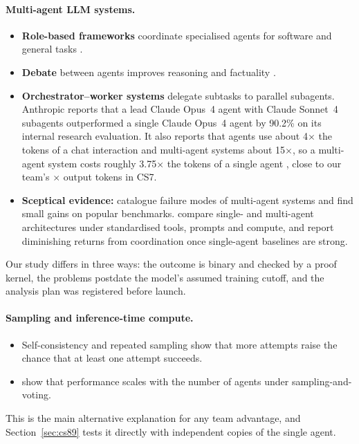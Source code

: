 \documentclass[11pt]{article}
\begin{document}
\paragraph{Multi-agent LLM systems.}
\begin{itemize}
  \item \textbf{Role-based frameworks} coordinate specialised agents for software and general tasks
    \citep{wu2023autogen,hong2023metagpt,qian2023chatdev}.
  \item \textbf{Debate} between agents improves reasoning and factuality \citep{du2023debate}.
  \item \textbf{Orchestrator--worker systems} delegate subtasks to parallel subagents. Anthropic reports that a lead
    Claude Opus~4 agent with Claude Sonnet~4 subagents outperformed a single Claude Opus~4 agent by 90.2\% on its
    internal research evaluation. It also reports that agents use about 4$\times$ the tokens of a chat interaction and
    multi-agent systems about 15$\times$, so a multi-agent system costs roughly 3.75$\times$ the tokens of a single agent
    \citep{anthropic2025multiagent}, close to our team's \CSsevenOutRatio$\times$ output tokens in CS7.
  \item \textbf{Sceptical evidence:} \citet{cemri2025fail} catalogue failure modes of multi-agent systems and find small
    gains on popular benchmarks. \citet{kim2025scaling} compare single- and multi-agent architectures under standardised
    tools, prompts and compute, and report diminishing returns from coordination once single-agent baselines are strong.
\end{itemize}
Our study differs in three ways: the outcome is binary and checked by a proof kernel, the problems postdate the
model's assumed training cutoff, and the analysis plan was registered before launch.

\paragraph{Sampling and inference-time compute.}
\begin{itemize}
  \item Self-consistency \citep{wang2023selfconsistency} and repeated sampling \citep{brown2024monkeys} show that more
    attempts raise the chance that at least one attempt succeeds.
  \item \citet{li2024moreagents} show that performance scales with the number of agents under sampling-and-voting.
\end{itemize}
This is the main alternative explanation for any team advantage, and Section~\ref{sec:cs89} tests it directly
with independent copies of the single agent.
\end{document}

